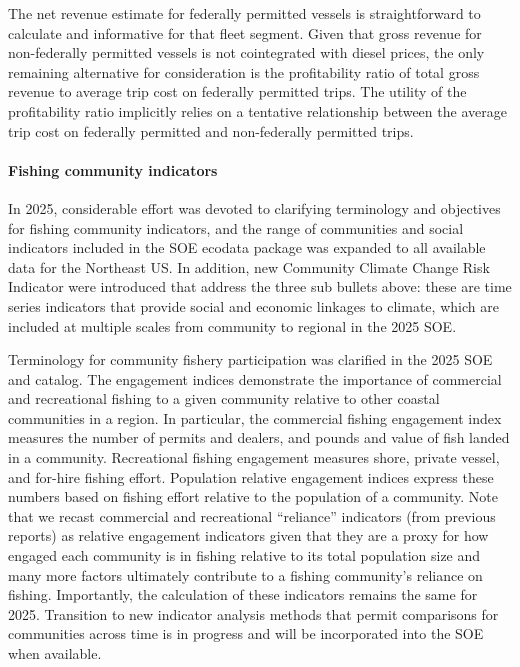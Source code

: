 \documentclass[
  10pt,
]{article}
\begin{document}
The net revenue estimate for federally permitted vessels is
straightforward to calculate and informative for that fleet segment.
Given that gross revenue for non-federally permitted vessels is not
cointegrated with diesel prices, the only remaining alternative for
consideration is the profitability ratio of total gross revenue to
average trip cost on federally permitted trips. The utility of the
profitability ratio implicitly relies on a tentative relationship
between the average trip cost on federally permitted and non-federally
permitted trips.

\paragraph{Fishing community
indicators}\label{fishing-community-indicators}

In 2025, considerable effort was devoted to clarifying terminology and
objectives for fishing community indicators, and the range of
communities and social indicators included in the SOE ecodata package
was expanded to all available data for the Northeast US. In addition,
new Community Climate Change Risk Indicator were introduced that address
the three sub bullets above: these are time series indicators that
provide social and economic linkages to climate, which are included at
multiple scales from community to regional in the 2025 SOE.

Terminology for community fishery participation was clarified in the
2025 SOE and catalog. The engagement indices demonstrate the importance
of commercial and recreational fishing to a given community relative to
other coastal communities in a region. In particular, the commercial
fishing engagement index measures the number of permits and dealers, and
pounds and value of fish landed in a community. Recreational fishing
engagement measures shore, private vessel, and for-hire fishing effort.
Population relative engagement indices express these numbers based on
fishing effort relative to the population of a community. Note that we
recast commercial and recreational ``reliance'' indicators (from
previous reports) as relative engagement indicators given that they are
a proxy for how engaged each community is in fishing relative to its
total population size and many more factors ultimately contribute to a
fishing community's reliance on fishing. Importantly, the calculation of
these indicators remains the same for 2025. Transition to new indicator
analysis methods that permit comparisons for communities across time is
in progress and will be incorporated into the SOE when available.
\end{document}
